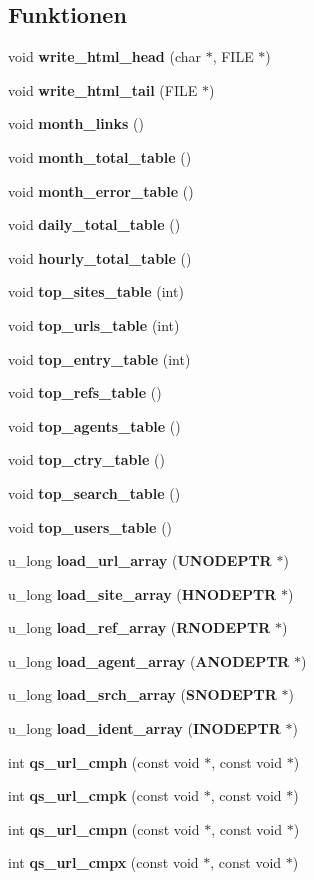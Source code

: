 \subsection*{Funktionen}
\begin{CompactItemize}
\item 
void {\bf write\_\-html\_\-head} (char $\ast$, FILE $\ast$)
\item 
void {\bf write\_\-html\_\-tail} (FILE $\ast$)
\item 
void {\bf month\_\-links} ()
\item 
void {\bf month\_\-total\_\-table} ()
\item 
void {\bf month\_\-error\_\-table} ()
\item 
void {\bf daily\_\-total\_\-table} ()
\item 
void {\bf hourly\_\-total\_\-table} ()
\item 
void {\bf top\_\-sites\_\-table} (int)
\item 
void {\bf top\_\-urls\_\-table} (int)
\item 
void {\bf top\_\-entry\_\-table} (int)
\item 
void {\bf top\_\-refs\_\-table} ()
\item 
void {\bf top\_\-agents\_\-table} ()
\item 
void {\bf top\_\-ctry\_\-table} ()
\item 
void {\bf top\_\-search\_\-table} ()
\item 
void {\bf top\_\-users\_\-table} ()
\item 
u\_\-long {\bf load\_\-url\_\-array} ({\bf UNODEPTR} $\ast$)
\item 
u\_\-long {\bf load\_\-site\_\-array} ({\bf HNODEPTR} $\ast$)
\item 
u\_\-long {\bf load\_\-ref\_\-array} ({\bf RNODEPTR} $\ast$)
\item 
u\_\-long {\bf load\_\-agent\_\-array} ({\bf ANODEPTR} $\ast$)
\item 
u\_\-long {\bf load\_\-srch\_\-array} ({\bf SNODEPTR} $\ast$)
\item 
u\_\-long {\bf load\_\-ident\_\-array} ({\bf INODEPTR} $\ast$)
\item 
int {\bf qs\_\-url\_\-cmph} (const void $\ast$, const void $\ast$)
\item 
int {\bf qs\_\-url\_\-cmpk} (const void $\ast$, const void $\ast$)
\item 
int {\bf qs\_\-url\_\-cmpn} (const void $\ast$, const void $\ast$)
\item 
int {\bf qs\_\-url\_\-cmpx} (const void $\ast$, const void $\ast$)

\end{CompactItemize}
